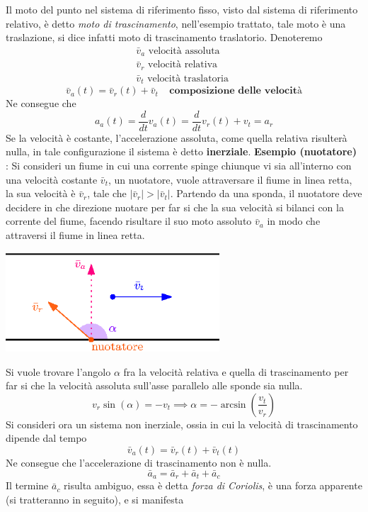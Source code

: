 \documentclass[10pt, letterpaper]{report}
\begin{document}
\acc 
Il moto del punto nel sistema di riferimento fisso, visto dal sistema di riferimento relativo, è 
detto \textit{moto di trascinamento}, nell'esempio trattato, tale moto è una traslazione, si dice 
infatti moto di trascinamento traslatorio. Denoteremo $$ \begin{matrix}
    \bar v_a \text{ velocità assoluta }\\ 
    \bar v_r \text{ velocità relativa }\\ 
    \bar v_t \text{ velocità traslatoria }
\end{matrix}$$ 
$$\bar v_a(t)=\bar v_r(t)+\bar v_t \ \ \ \ \ \textbf{composizione delle velocità}$$ 
Ne consegue che 
$$a_a(t)=\frac{d}{dt}v_a(t)=\frac{d}{dt}v_r(t)+v_t=a_r $$ 
Se la velocità è costante, l'accelerazione assoluta, come quella relativa risulterà nulla, in tale 
configurazione il sistema è detto \textbf{inerziale}.\acc 
\textbf{Esempio (nuotatore)} : Si consideri un fiume in cui una corrente spinge chiunque vi sia all'interno 
con una velocità costante $\bar v_t$, un nuotatore, vuole attraversare il fiume in linea retta, 
la sua velocità è $\bar v_r$, tale che $|\bar v_r|>|\bar v_t|$.\acc 
Partendo da una sponda, il nuotatore deve decidere in che direzione nuotare per far si che 
la sua velocità si bilanci con la corrente del fiume, facendo risultare il suo moto 
assoluto $\bar v_a$ in modo che attraversi il fiume in linea retta.
\begin{center}
    \includegraphics[width=0.6\textwidth]{images/nuotatore.eps}
\end{center}
Si vuole trovare l'angolo $\alpha$ fra la velocità relativa e quella di trascinamento per far 
si che la velocità assoluta sull'asse  parallelo alle sponde sia nulla.
$$ v_r \sin(\alpha)=- v_t \implies \alpha = -\arcsin(\frac{v_t}{v_r}) $$ 
Si consideri ora un sistema non inerziale, ossia in cui la velocità di trascinamento dipende dal tempo 
$$\bar v_a(t) = \bar v_r(t) + \bar v_t(t) $$
Ne consegue che l'accelerazione di trascinamento non è nulla. 
$$\bar a_a = \bar a_r + \bar a_t + \bar a_c $$
Il termine $\bar a_c$ risulta ambiguo, essa è detta \textit{forza di Coriolis}, è una 
forza apparente (si tratteranno in seguito), e si manifesta 
\end{document}
